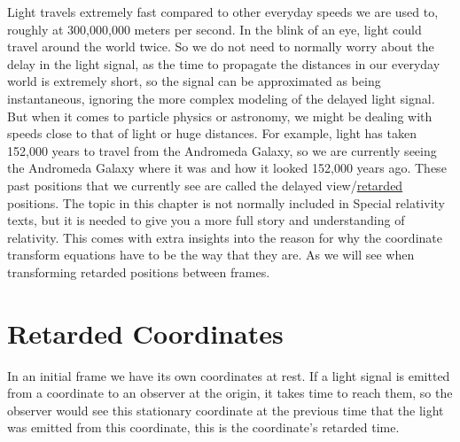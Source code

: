 Light travels extremely fast compared to other everyday speeds we are used to, roughly at 300,000,000 meters per second.
In the blink of an eye, light could travel around the world twice.
So we do not need to normally worry about the delay in the light signal, as the time to propagate the distances in our everyday world is extremely short, so the signal can be approximated as being instantaneous, ignoring the more complex modeling of the delayed light signal.
But when it comes to particle physics or astronomy, we might be dealing with speeds close to that of light or huge distances.
For example, light has taken 152,000 years to travel from the Andromeda Galaxy, so we are currently seeing the Andromeda Galaxy where it was and how it looked 152,000 years ago.
These past positions that we currently see are called the delayed view/\hyperlink{def-retarded-position}{retarded} positions.
The topic in this chapter is not normally included in Special relativity texts, but it is needed to give you a more full story and understanding of relativity.
This comes with extra insights into the reason for why the coordinate transform equations have to be the way that they are.
As we will see when transforming retarded positions between frames.

\section{Retarded Coordinates} \label{sect: Retarded Coordinates}

In an initial frame we have its own coordinates at rest.
If a light signal is emitted from a coordinate to an observer at the origin, it takes time to reach them, so the observer would see this stationary coordinate at the previous time that the light was emitted from this coordinate, this is the coordinate's retarded time.


